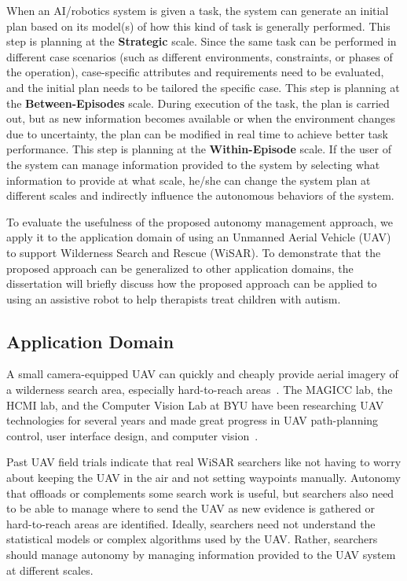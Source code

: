 When an AI/robotics system is given a task, the system can generate an initial plan based on its model(s) of how this kind of task is generally performed. This step is planning at the \textbf{Strategic} scale. Since the same task can be performed in different case scenarios (such as different environments, constraints, or phases of the operation), case-specific attributes and requirements need to be evaluated, and the initial plan needs to be tailored the specific case. This step is planning at the \textbf{Between-Episodes} scale. During execution of the task, the plan is carried out, but as new information becomes available or when the environment changes due to uncertainty, the plan can be modified in real time to achieve better task performance. This step is planning at the \textbf{Within-Episode} scale. If the user of the system can manage information provided to the system by selecting what information to provide at what scale, he/she can change the system plan at different scales and indirectly influence the autonomous behaviors of the system.

To evaluate the usefulness of the proposed autonomy management approach, we apply it to the application domain of using an Unmanned Aerial Vehicle (UAV) to support Wilderness Search and Rescue (WiSAR). To demonstrate that the proposed approach can be generalized to other application domains, the dissertation will briefly discuss how the proposed approach can be applied to using an assistive robot to help therapists treat children with autism.

\subsection{Application Domain}

A small camera-equipped UAV can quickly and cheaply provide aerial imagery of a wilderness search area, especially hard-to-reach areas~\cite{Goodrich2008Supporting}. The MAGICC lab, the HCMI lab, and the Computer Vision Lab at BYU have been researching UAV technologies for several years and made great progress in UAV path-planning control, user interface design, and computer vision~\cite{Lin2010Supporting}.

Past UAV field trials indicate that real WiSAR searchers like not having to worry about keeping the UAV in the air and not setting waypoints manually. Autonomy that offloads or complements some search work is useful, but searchers also need to be able to manage where to send the UAV as new evidence is gathered or hard-to-reach areas are identified. Ideally, searchers need not understand the statistical models or complex algorithms used by the UAV. Rather, searchers should manage autonomy by managing information provided to the UAV system at different scales.

